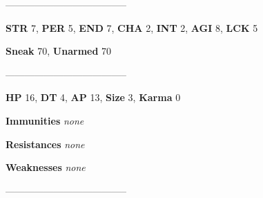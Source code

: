 \documentclass[11pt,a4paper,twocolumn]{book}
\begin{document}
%		
%	
%		

	--------------------------------------

	\noindent
	\textbf{STR} 7, \textbf{PER} 5, \textbf{END} 7, \textbf{CHA} 2, \textbf{INT} 2, \textbf{AGI} 8, \textbf{LCK} 5
	
	\noindent
	\textbf{Sneak} 70, \textbf{Unarmed} 70
	
	--------------------------------------
	
	\noindent
	\textbf{HP} 16, \textbf{DT} 4, \textbf{AP} 13, \textbf{Size} 3, \textbf{Karma} 0
	
	
	\noindent
	\textbf{Immunities} \emph{none}
	
	\noindent
	\textbf{Resistances} \emph{none}
	
	\noindent
	\textbf{Weaknesses} \emph{none} %
	
	--------------------------------------
	
\end{document}
